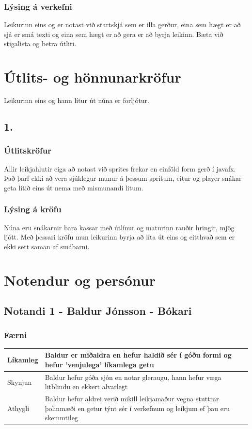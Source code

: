 \documentclass{article}
\begin{document}
\subsubsection*{Lýsing á verkefni}
Leikurinn eins og er notast við startskjá sem er illa gerður, 
eina sem hægt er að sjá er smá texti og eina sem hægt er að gera er að byrja leikinn.
Bæta við stigalista og betra útliti.


\section*{Útlits- og hönnunarkröfur}
Leikurinn eins og hann lítur út núna er forljótur.
\subsection*{1.}
\subsubsection*{Útlitskröfur}
Allir leikjahlutir eiga að notast við sprites frekar en einföld form gerð í javafx.
Það þarf ekki að vera sjúklegur munur á þessum spritum, 
eitur og player snákar geta litið eins út nema með mismunandi litum.

\subsubsection*{Lýsing á kröfu}
Núna eru snákarnir bara kassar með útlínur og maturinn rauðir hringir, mjög ljótt.
Með þessari kröfu mun leikurinn byrja að líta út eins og eitthvað sem er ekki sett saman af smábarni.


\section*{Notendur og persónur}
\subsection*{Notandi 1 - Baldur Jónsson - Bókari}
\subsubsection*{Færni}
\begin{center}
    \begin{tabular}{|p{2cm}|p{9cm}|}
        \hline
        Líkamleg&Baldur er miðaldra en hefur haldið sér í góðu formi og hefur 'venjulega' líkamlega getu\\
        \hline
        Skynjun&Baldur hefur góða sjón en notar gleraugu, hann hefur væga litblindu en ekkert alvarlegt\\
        \hline
        Athygli&Baldur hefur aldrei verið mikill leikjamaður vegna stuttrar þolinmæði en getur týnt sér í verkefnum og leikjum ef þau eru skemmtileg\\
        \hline
    \end{tabular}
\end{center}
\end{document}
